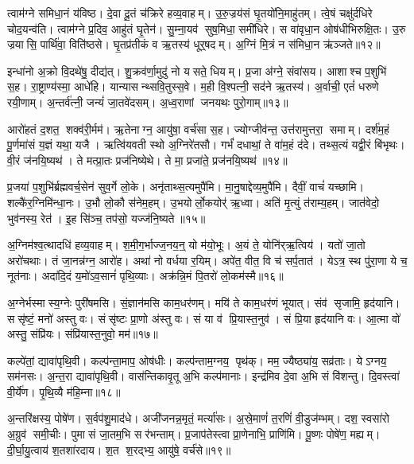 त्वाम॑ग्ने समिधा॒नं य॑विष्ठ। दे॒वा दू॒तं च॑क्रिरे हव्य॒वाहम्। उ॒रु॒ज्रय॑सं घृ॒तयो॑नि॒माहु॑तम्। त्वे॒षं चक्षु॑र्दधिरे चोद॒यन्व॑ति। त्वाम॑ग्ने प्र॒दिव॒ आहु॑तं घृ॒तेन॑। सु॒म्ना॒यव॑ सुष॒मिधा॒ समी॑धिरे। स वा॑वृधा॒न ओष॑धीभिरुक्षि॒तः। उ॒रु ज्रयासि॒ पार्थि॑वा॒ विति॑ष्ठसे। घृ॒तप्र॑तीकं व ऋ॒तस्य॑ धूर्॒षदम्। अ॒ग्निं मि॒त्रं न स॑मिधा॒न ऋ॑ञ्जते॥१२॥

इन्धा॑नो अ॒क्रो वि॒दथे॑षु॒ दीद्य॑त्। शु॒क्रव॑र्णा॒मुदु॑ नो यसते॒ धियम्। प्र॒जा अ॑ग्ने॒ संवा॑सय। आशाश्च प॒शुभि॑ स॒ह। रा॒ष्ट्राण्य॑स्मा॒ आधे॑हि। यान्यासन्थ्सवि॒तुस्स॒वे। म॒ही वि॒श्पत्नी॒ सद॑ने ऋ॒तस्य॑। अ॒र्वाची॒ एतं॑ धरुणे रयी॒णाम्। अ॒न्तर्व॑त्नी॒ जन्यं॑ जा॒तवे॑दसम्। अ॒ध्व॒राणां जनयथः पुरो॒गाम्॥१३॥

आरो॑हतं द॒शत॒ शक्व॑री॒र्मम॑। ऋ॒तेनाग्न॒ आयु॑षा॒ वर्च॑सा स॒ह। ज्योग्जीव॑न्त॒ उत्त॑रामुत्तरा॒ समाम्। दर्\mbox{}श॑म॒हं पू॒र्णमा॑सं य॒ज्ञं यथा॒ यजै। ऋत्वि॑यवती स्थो अ॒ग्निरे॑तसौ। गर्भं॑ दधाथां॒ ते वा॑म॒हं द॑दे। तथ्स॒त्यं यद्वी॒रं बि॑भृथः। वी॒रं ज॑नयि॒ष्यथ॑। ते मत्प्रा॒तः प्रज॑निष्येथे। ते मा॒ प्रजा॑ते॒ प्रज॑नयि॒ष्यथ॑॥१४॥

प्र॒जया॑ प॒शुभि॑र्ब्रह्मवर्च॒सेन॑ सुव॒र्गे लो॒के। अनृ॑ताथ्स॒त्यमुपै॑मि। मा॒नु॒षाद्देव्य॒मुपै॑मि। दैवीं॒ वाचं॑ यच्छामि। शल्कै॑र॒ग्निमि॑न्धा॒नः। उ॒भौ लो॒कौ स॑नेम॒हम्। उ॒भयोर्लो॒कयोर्॑ ऋ॒ध्वा। अति॑ मृ॒त्युं त॑राम्य॒हम्। जात॑वेदो॒ भुव॑नस्य॒ रेत॑। इ॒ह सि॑ञ्च॒ तप॑सो॒ यज्ज॑नि॒ष्यते॥१५॥

अ॒ग्निम॑श्व॒त्थादधि॑ हव्य॒वाहम्। श॒मी॒ग॒र्भाज्ज॒नय॒न्॒ यो म॑यो॒भूः। अ॒यं ते॒ योनि॑र्‌ऋ॒त्विय॑। यतो॑ जा॒तो अरो॑चथाः। तं जा॒नन्न॑ग्न॒ आरो॑ह। अथा॑ नो वर्धया र॒यिम्। अपे॑त॒ वीत॒ वि च॑ सर्प॒तात॑। येऽत्र॒ स्थ पु॑रा॒णा ये च॒ नूत॑नाः। अदा॑दि॒दं य॒मो॑ऽव॒सानं॑ पृथि॒व्याः। अक्र॑न्नि॒मं पि॒तरो॑ लो॒कम॑स्मै॥१६॥

अ॒ग्नेर्भस्मास्य॒ग्नेः पुरी॑षमसि। सं॒ज्ञान॑मसि काम॒धर॑णम्। मयि॑ ते काम॒धर॑णं भूयात्। संव॑ सृजामि॒ हृद॑यानि। ससृ॑ष्टं॒ मनो॑ अस्तु वः। संसृ॑ष्टः प्रा॒णो अ॑स्तु वः। सं या व॑ प्रि॒यास्त॒नुव॑। सं प्रि॒या हृद॑यानि वः। आ॒त्मा वो॑ अस्तु॒ संप्रि॑यः। संप्रि॑यास्त॒नुवो॒ मम॑॥१७॥

कल्पे॑तां॒ द्यावा॑पृथि॒वी। कल्प॑न्ता॒माप॒ ओष॑धीः। कल्प॑न्ताम॒ग्नय॒ पृथ॑क्। मम॒ ज्यैष्ठ्या॑य॒ सव्र॑ताः। येऽग्नय॒ सम॑नसः। अ॒न्त॒रा द्यावा॑पृथि॒वी। वास॑न्तिकावृ॒तू अ॒भि कल्प॑मानाः। इन्द्र॑मिव दे॒वा अ॒भि सं वि॑शन्तु। दि॒वस्त्वा॑ वी॒र्ये॑ण। पृ॒थि॒व्यै म॑हि॒म्ना॥१८॥

अ॒न्तरि॑क्षस्य॒ पोषे॑ण। स॒र्वप॑शु॒माद॑धे। अजी॑जनन्न॒मृतं॒ मर्त्या॑सः। अ॒स्रे॒माणं॑ त॒रणिं॑ वी॒डुज॑म्भम्। दश॒ स्वसा॑रो अ॒ग्रुव॑ समी॒चीः। पुमासं जा॒तम॒भि सर॑भन्ताम्। प्र॒जाप॑तेस्त्वा प्रा॒णेनाभि॒ प्राणि॑मि। पू॒ष्णः पोषे॑ण॒ मह्यम्। दी॒र्घा॒यु॒त्वाय॑ श॒तशा॑रदाय। श॒त श॒रद्भ्य॒ आयु॑षे॒ वर्च॑से॥१९॥

